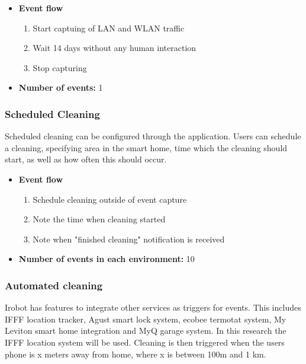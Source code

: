 \begin{itemize}
    \item \textbf{Event flow} \begin{enumerate}
                                    \item Start captuing of LAN and WLAN traffic
                                    \item Wait 14 days without any human interaction
                                    \item Stop capturing
                                \end{enumerate}
    \item \textbf{Number of events:} 1
\end{itemize}

\subsubsection{Scheduled Cleaning}
Scheduled cleaning can be configured through the application. Users can schedule a cleaning, specifying area in the smart home, time which the cleaning should start, as well as how often this should occur. 
\begin{itemize}
    \item \textbf{Event flow} \begin{enumerate}
                                    \item Schedule cleaning outside of event capture
                                    \item Note the time when cleaning started
                                    \item Note when "finished cleaning" notification is received
                                \end{enumerate}
    \item \textbf{Number of events in each environment:} 10
\end{itemize}

\subsubsection{Automated cleaning}
Irobot has features to integrate other services as triggers for events. This includes IFFF location tracker, Agust smart lock system, ecobee termotat system, My Leviton smart home integration and MyQ garage system. In this research the IFFF location system will be used. Cleaning is then triggered when the users phone is x meters away from home, where x is between 100m and 1 km. 


